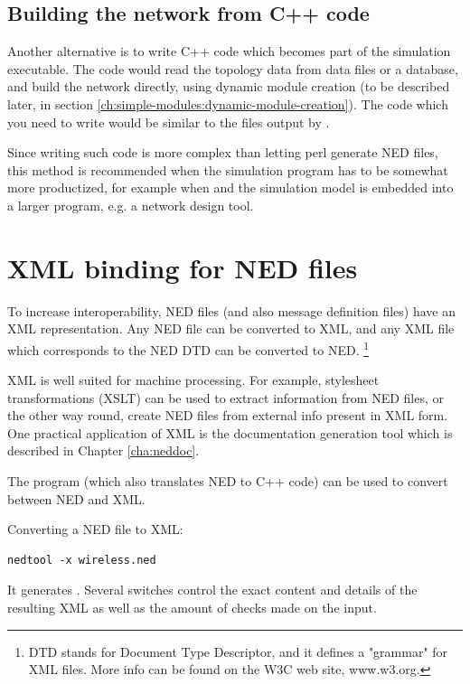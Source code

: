 \subsection{Building the network from C++ code}

Another alternative is to write C++ code which becomes part of the
simulation executable. The code would read the topology data from data
files or a database, and build the network directly, using
dynamic module creation (to be described later, in section
\ref{ch:simple-modules:dynamic-module-creation}).
The code which you need to write would be similar to the 
files output by .

Since writing such code is more complex than letting perl generate
NED files, this method is recommended when the simulation program
has to be somewhat more productized, for example when {\opp}
and the simulation model is embedded into a larger program, e.g.
a network design tool.


\section{XML binding for NED files}

To increase interoperability, NED files (and also message definition files)
have an XML representation. Any NED file can be converted to XML, and
any XML file which corresponds to the NED DTD can be converted to NED.
  \footnote{DTD stands for Document Type Descriptor, and it defines
  a "grammar" for XML files. More info can be found on the W3C web site,
  www.w3.org.}

XML is well suited for machine processing. For example, stylesheet
transformations (XSLT) can be used to extract information from NED files,
or the other way round, create NED files from external info present in
XML form. One practical application of XML is the 
documentation generation tool which is described in Chapter \ref{cha:neddoc}.

The  program (which also translates NED to C++ code)
can be used to convert between NED and XML.

Converting a NED file to XML:

\begin{verbatim}
nedtool -x wireless.ned
\end{verbatim}

It generates .
Several switches control the exact content and details
of the resulting XML as well as the amount of checks
made on the input.

